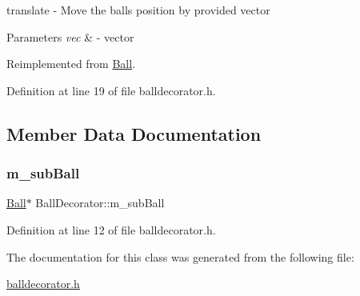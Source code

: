 translate -\/ Move the ball\textquotesingle{}s position by provided vector 


\begin{DoxyParams}{Parameters}
{\em vec} & -\/ vector \\
\hline
\end{DoxyParams}


Reimplemented from \mbox{\hyperlink{class_ball_a88546ffd1a37b301a5c7085f3eabe8f0}{Ball}}.



Definition at line 19 of file balldecorator.\+h.



\subsection{Member Data Documentation}
\mbox{\label{class_ball_decorator_ab002bec02e2638a0c600c467f51e27f3}} 
\subsubsection{\texorpdfstring{m\+\_\+sub\+Ball}{m\_subBall}}
{\footnotesize\ttfamily \mbox{\hyperlink{class_ball}{Ball}}$\ast$ Ball\+Decorator\+::m\+\_\+sub\+Ball\hspace{0.3cm}{\ttfamily [protected]}}



Definition at line 12 of file balldecorator.\+h.



The documentation for this class was generated from the following file\+:\begin{DoxyCompactItemize}
\item 
\mbox{\hyperlink{balldecorator_8h}{balldecorator.\+h}}\end{DoxyCompactItemize}
